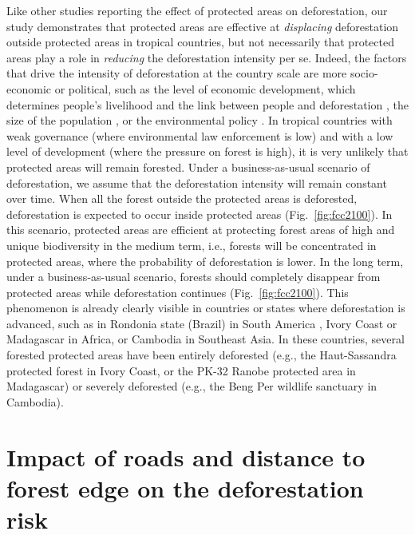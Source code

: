 \documentclass[
  12pt,
]{article}
\begin{document}
Like other studies reporting the effect of protected areas on deforestation, our study demonstrates that protected areas are effective at \emph{displacing} deforestation outside protected areas in tropical countries, but not necessarily that protected areas play a role in \emph{reducing} the deforestation intensity per se. Indeed, the factors that drive the intensity of deforestation at the country scale are more socio-economic or political, such as the level of economic development, which determines people's livelihood and the link between people and deforestation \citep{Geist2002}, the size of the population \citep{Barnes1990}, or the environmental policy \citep{Soares-Filho2014}. In tropical countries with weak governance (where environmental law enforcement is low) and with a low level of development (where the pressure on forest is high), it is very unlikely that protected areas will remain forested. Under a business-as-usual scenario of deforestation, we assume that the deforestation intensity will remain constant over time. When all the forest outside the protected areas is deforested, deforestation is expected to occur inside protected areas (Fig.~\ref{fig:fcc2100}). In this scenario, protected areas are efficient at protecting forest areas of high and unique biodiversity in the medium term, i.e., forests will be concentrated in protected areas, where the probability of deforestation is lower. In the long term, under a business-as-usual scenario, forests should completely disappear from protected areas while deforestation continues (Fig.~\ref{fig:fcc2100}). This phenomenon is already clearly visible in countries or states where deforestation is advanced, such as in Rondonia state (Brazil) in South America \citep{Ribeiro2005}, Ivory Coast \citep{Sangne2015} or Madagascar \citep{Vieilledent2020} in Africa, or Cambodia \citep{Davis2015} in Southeast Asia. In these countries, several forested protected areas have been entirely deforested (e.g., the Haut-Sassandra protected forest in Ivory Coast, or the PK-32 Ranobe protected area in Madagascar) or severely deforested (e.g., the Beng Per wildlife sanctuary in Cambodia).

\hypertarget{impact-of-roads-and-distance-to-forest-edge-on-the-deforestation-risk}{%
\section{Impact of roads and distance to forest edge on the deforestation risk}\label{impact-of-roads-and-distance-to-forest-edge-on-the-deforestation-risk}}
\end{document}
